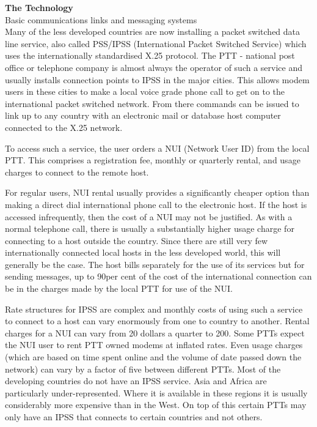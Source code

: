 {\bf The Technology}\\
Basic communications links and messaging systems\\
Many of the less developed countries are now installing a packet switched
data line service, also called PSS/IPSS (International Packet Switched
Service) which uses the internationally standardised X.25 protocol. The
PTT - national post office or telephone company is almost always the
operator of such a service and usually installs connection points to IPSS
in the major cities. This allows modem users in these cities to make a
local voice grade phone call to get on to the international packet switched
network. From there commands can be issued to link up to any country with
an electronic mail or database host computer connected to the X.25 network.

To access such a service, the user orders a NUI (Network User ID) from the
local PTT. This comprises a registration fee, monthly or quarterly rental,
and usage charges to connect to the remote host. 

For regular users, NUI rental usually provides a significantly cheaper
option than making a direct dial international phone call to the electronic
host. If the host is accessed infrequently, then the cost of a NUI may not
be justified. As with a normal telephone call, there is usually a
substantially higher usage charge for connecting to a host outside the
country. Since there are  still very few internationally connected local
hosts in the less developed  world, this will generally be the case. The
host bills separately for  the use of its services but for sending
messages, up to 90per cent of the cost of the  international connection can be in
the charges made by the local PTT for use of the NUI.

Rate structures for IPSS are complex and monthly costs of using such a
service to connect to a host can vary enormously from one to country to
another. Rental charges for a NUI can vary from 20 dollars a quarter to 200.
Some PTTs expect the NUI user to rent PTT owned modems at inflated rates.
Even usage charges (which are based on time spent online and the volume of
date passed down the network) can vary by a factor of five between
different PTTs. Most of the developing
countries do not have an IPSS service. Asia and Africa are particularly
under-represented. Where it is available in these regions it is usually
considerably more expensive than in the West. On top of this certain PTTs
may only have an IPSS that connects to certain countries and not others.

